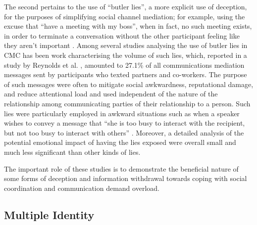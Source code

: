 \documentclass{IOS-Book-Article}     %
\newcommand{\tbox}[3][red]{{
\color{#1}\noindent{
   \fbox{\scriptsize{ {\bf #2} \textsl{#3}}}
   \vspace{2pt}
}
}}
\newcommand{\todo}[1]{\tbox{TODO:}{#1}}
\begin{document}
The second pertains to the use of ``butler lies'', a more explicit use of
deception, for the purposes of simplifying social channel mediation; for
example, using the excuse that ``have a meeting with my boss'', when in fact, no
such meeting exists, in order to terminate a conversation without the other
participant feeling like they aren't important
\cite{Hancock:2009:BLA:1518701.1518782}.  Among several studies analysing the
use of butler lies in CMC has been work characterising the volume of such lies,
which, reported in a study by Reynolds et al.
\cite{Reynolds:2013:BLB:2441776.2441862}, amounted to 27.1\% of all
communications mediation messages sent by participants who texted partners and
co-workers. The purpose of such messages were often to mitigate social
awkwardness, reputational damage, and reduce attentional load and used
independent of the nature of the relationship among communicating parties of
their relationship to a person.  Such lies were particularly employed in awkward
situations such as when a speaker wishes to convey a message that ``she is too
busy to interact with the recipient, but not too busy to interact with others''
\cite{Reynolds:2013:BLB:2441776.2441862}.  Moreover, a detailed analysis of the
potential emotional impact of having the lies exposed were overall small and
much less significant than other kinds of lies.                    

The important role of these studies is to demonstrate the beneficial nature of
some forms of deception and information withdrawal towards  coping with social
coordination and communication demand overload.     






\subsection{Multiple Identity}
\end{document}
